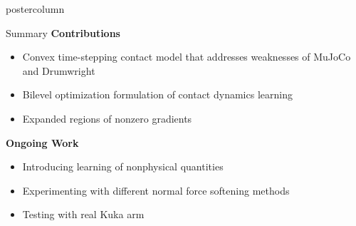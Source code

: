\documentclass[final,hyperref={pdfpagelabels=false},5pt]{beamer}
\begin{document}
\begin{frame}
\begin{columns}
\begin{column}{.49\textwidth}
\begin{beamercolorbox}[center,wd=\textwidth]{postercolumn}
\begin{minipage}[T]{.95\textwidth}
{             \begin{block}{Summary}
             \textbf{Contributions}
              \begin{itemize}
                  \item Convex time-stepping contact model that addresses weaknesses of MuJoCo and Drumwright
                  \item Bilevel optimization formulation of contact dynamics learning
                  \item Expanded regions of nonzero gradients
              \end{itemize}
              \vspace{1ex}
               \textbf{Ongoing Work}             
              \begin{itemize}
                  \item Introducing learning of nonphysical quantities
                  \item Experimenting with different normal force softening methods
                  \item Testing with real Kuka arm
              \end{itemize}
            \end{block}
            
          }
        \end{minipage}
      \end{beamercolorbox}
    \end{column}
  \end{columns}
  
%
%
   
\end{frame}
\end{document}
